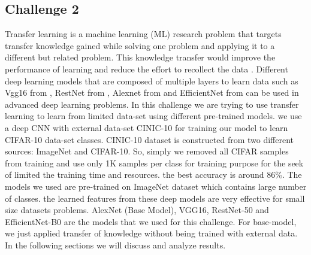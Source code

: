 \documentclass[10pt,twocolumn,letterpaper]{article}
\begin{document}
\begin{table*}[h!]
\begin{tabular}{|p{1.5cm}|p{3cm}|p{3cm}|p{3cm}|p{3cm}|p{1cm}|}
    \hline
    \end{tabular}
\end{table*}


\subsection{Challenge 2}
\label{challenge2_subsection}
Transfer learning is a machine learning (ML) research problem that targets transfer knowledge gained  while solving one problem and applying it to a different but related problem. This knowledge transfer would improve the performance of learning and reduce 
the effort to recollect the data \cite{transfer-learning}. Different deep learning models that are composed of multiple layers to learn data such as Vgg16 from 
\cite{vgg16}, RestNet from \cite{Resnet50} , Alexnet from \cite{Alexnet} and EfficientNet from \cite{Efficientnet} can be used in advanced deep learning problems. In this challenge we are trying to use transfer learning to learn from limited data-set using different pre-trained models. we use a deep CNN with external data-set CINIC-10 \cite{cinic-10} for training our model to learn CIFAR-10 \cite{CIFAR-10} data-set classes. CINIC-10 dataset is constructed from two different sources: ImageNet and CIFAR-10. So, simply we removed all CIFAR samples from training and use only 1K samples per class for training purpose for the seek of limited the training time and resources. the best accuracy is around 86\%. 
\newline
The models we used are pre-trained on ImageNet dataset which contains large number of classes. the learned features from these deep models are very effective for small size datasets problems. AlexNet (Base Model), VGG16, RestNet-50 and EfficientNet-B0 are the models that we used for this challenge. For base-model, we just applied transfer of knowledge without being trained with external data. In the following sections we will discuss and analyze results.
\end{document}
